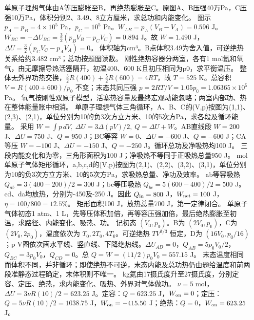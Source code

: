 \problemtext 单原子理想气体由A等压膨胀至B，再绝热膨胀至C。原图A、B压强40万Pa，C压强10万Pa，体积分别2、3.49、8立方厘米，求总功和内能变化。
\workings 图示 $p_A=p_B=4\times10^5$ Pa，$p_C=10^5$ Pa。$W_{AB}=p_A(V_B-V_A)=0.596$ J。$W_{BC}=-\Delta U_{BC}=\frac32(p_BV_B-p_CV_C)=0.894$ J。故 $W=1.490$ J，$\Delta U=\frac32(p_CV_C-p_AV_A)=0$。
\crosscheck 体积轴为cm³。B点体积3.49为舍入值，可逆绝热关系给约3.482 cm³；总功按题图读数。
\problemtext 刚性绝热容器分两室，各有1 mol氦和氧气，由无摩擦导热活塞隔开，初温400、600 K且初压相同为p0，求平衡温压。
\workings 整体无外界功热交换，$\frac32R(400)+\frac52R(600)=4RT$，故 $T=525$ K。总容积 $V=R(400+600)/p_0$ 不变；末态共同压强 $p=2RT/V=1.05p_0=1.06365\times10^5$ Pa。
\crosscheck 氧气按刚性双原子模型，活塞热容量及最终宏观动能忽略；两室内部功、热在整体能量账中相消。
\problemtext 单原子理想气体三角循环，A、B、C的(V,p)按图为(1,1)、(2,3)、(2,1)，单位分别为10的负3次方立方米、10的5次方Pa，求各段及循环能量。
\workings 采用 $W=\int p\,dV,\ \Delta U=3\Delta(pV)/2,\ Q=\Delta U+W$。AB直线段 $W=200$ J、$\Delta U=750$ J、$Q=950$ J；BC等容 $W=0$、$\Delta U=-600$ J、$Q=-600$ J；CA等压 $W=-100$ J、$\Delta U=-150$ J、$Q=-250$ J。循环总功及净吸热均100 J。
\crosscheck 三段内能变化和为零，三角形面积为100 J；净吸热不等同于正吸热总量950 J。
 mol单原子气体矩形循环，a,b,c,d的(V,p)按图为(2,1)、(2,2)、(3,2)、(3,1)，单位分别为10的负3次方立方米、10的5次方Pa，求吸热总量、净功及效率。
\workings ab等容吸热 $Q_{ab}=3(400-200)/2=300$ J；bc等压吸热 $Q_{bc}=5(600-400)/2=500$ J。cd、da均放热，分别为-450及-250 J。因此 $Q_{\rm in}=800$ J，$W_{\rm net}=100$ J，$\eta=100/800=12.5\%$。
\crosscheck 矩形面积100 J，放热总量700 J，第一定律闭合。
\problemtext 单原子气体初态1 atm、1 L，先等压体积加倍，再等容压强加倍，最后绝热膨胀至初温，求路径、内能变化、吸热、功。
\workings 记初态 $(V_0,p_0)$。B为 $(2V_0,p_0)$，C为 $(2V_0,2p_0)$，温度依次为 $T_0,2T_0,4T_0$。可逆绝热 $TV^{2/3}$ 恒定，D为 $(16V_0,p_0/16)$；p-V图依次画水平线、竖直线、下降绝热线。$\Delta U_{AD}=0$，$Q_{AB}=5p_0V_0/2$，$Q_{BC}=3p_0V_0$，$Q_{CD}=0$。总 $Q=W=(11/2)p_0V_0=557.15$ J。
\crosscheck 末态温度相同而体积不同，并非循环；即使绝热不可逆，末态内能及总功热仍由题给温度和前两段准静态过程确定，末体积则不唯一。
 kg氦由17摄氏度升至27摄氏度，分别定容、定压、绝热，求内能变化、吸热、外界对气体做功。
\workings $\nu=5$ mol，$\Delta U=3\nu R(10)/2=623.25$ J。定容：$Q=623.25$ J，$W_{\rm on}=0$；定压：$Q=5\nu R(10)/2=1038.75$ J，$W_{\rm on}=-415.50$ J；绝热：$Q=0$，$W_{\rm on}=623.25$ J。
